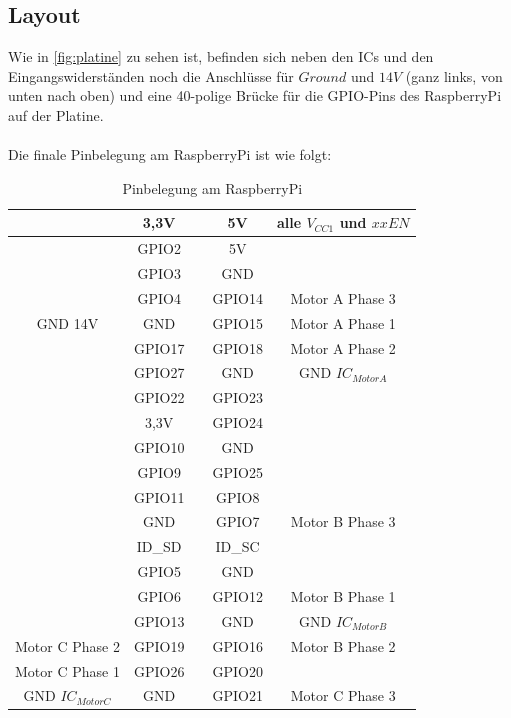 \documentclass[12pt,a4paper,bibliography=totocnumbered,listof=totocnumbered]{scrartcl}
\begin{document}
\subsection{Layout}
Wie in \autoref{fig:platine} zu sehen ist, befinden sich neben den ICs und den Eingangswiderständen noch die Anschlüsse für $Ground$ und $14V$ (ganz links, von unten nach oben) und eine 40-polige Brücke für die GPIO-Pins des RaspberryPi auf der Platine.\\\\
Die finale Pinbelegung am RaspberryPi ist wie folgt:

\begin{table}[htp] 
	\centering 
	\begin{tabular}{|c||c|c|c||c|}
		\hline 
		& 3,3V &  & 5V & alle $V_{CC1}$ und $xxEN$ \\ 
		\hline 
		& GPIO2 &  & 5V &  \\ 
		\hline 
		& GPIO3 &  & GND &  \\ 
		\hline 
		& GPIO4 &  & GPIO14 & Motor A Phase 3 \\ 
		\hline 
		GND 14V& GND &  & GPIO15 & Motor A Phase 1 \\ 
		\hline 
		& GPIO17 &  & GPIO18 & Motor A Phase 2 \\ 
		\hline 
		& GPIO27 &  & GND & GND $IC_{MotorA}$ \\ 
		\hline 
		& GPIO22 &  & GPIO23 &  \\ 
		\hline 
		& 3,3V &  & GPIO24 &  \\ 
		\hline 
		& GPIO10 &  & GND &  \\ 
		\hline 
		& GPIO9 &  & GPIO25 &  \\ 
		\hline 
		& GPIO11 &  & GPIO8 &  \\ 
		\hline 
		& GND &  & GPIO7 & Motor B Phase 3 \\ 
		\hline 
		& ID\_SD &  & ID\_SC &  \\ 
		\hline 
		& GPIO5 &  & GND &  \\ 
		\hline 
		& GPIO6 &  & GPIO12 & Motor B Phase 1 \\ 
		\hline 
		& GPIO13 &  & GND & GND $IC_{MotorB}$ \\ 
		\hline 
		Motor C Phase 2& GPIO19 &  & GPIO16 & Motor B Phase 2 \\ 
		\hline 
		Motor C Phase 1& GPIO26 &  & GPIO20 &  \\ 
		\hline 
		GND $IC_{MotorC}$& GND &  & GPIO21 & Motor C Phase 3 \\ 
		\hline 
	\end{tabular} 
	\caption{Pinbelegung am RaspberryPi} 
	\label{tab:pins}
\end{table}
\end{document}
